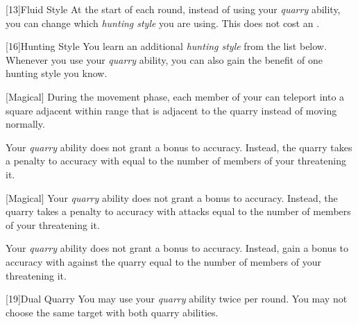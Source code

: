         [13]{Fluid Style}
        At the start of each round, instead of using your \textit{quarry} ability, you can change which \textit{hunting style} you are using.
        This does not cost an .

        [16]{Hunting Style}
        You learn an additional \textit{hunting style} from the list below.
        Whenever you use your \textit{quarry} ability, you can also gain the benefit of one hunting style you know.
        {
            [Magical]
            During the movement phase, each member of your  can teleport into a square adjacent within \rngmed range that is adjacent to the quarry instead of moving normally.

            Your \textit{quarry} ability does not grant a bonus to accuracy.
            Instead, the quarry takes a penalty to accuracy with  equal to the number of members of your  threatening it.

            [Magical]
            Your \textit{quarry} ability does not grant a bonus to accuracy.
            Instead, the quarry takes a penalty to accuracy with  attacks equal to the number of members of your  threatening it.

            Your \textit{quarry} ability does not grant a bonus to accuracy.
            Instead, gain a bonus to accuracy with  against the quarry equal to the number of members of your  threatening it.
        }

        [19]{Dual Quarry} You may use your \textit{quarry} ability twice per round.
        You may not choose the same target with both quarry abilities.

